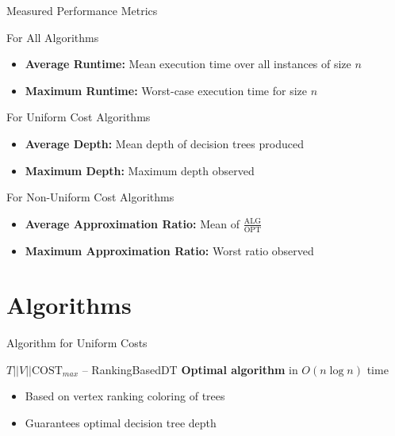 \documentclass[aspectratio=169]{beamer}
\newcommand{\OPT}{\text{OPT}}
\newcommand{\COST}{\text{COST}}
\begin{document}
\begin{frame}{Measured Performance Metrics}
\begin{block}{For All Algorithms}
\begin{itemize}
    \item \textbf{Average Runtime:} Mean execution time over all instances of size $n$
    \item \textbf{Maximum Runtime:} Worst-case execution time for size $n$
\end{itemize}
\end{block}

\pause

\begin{block}{For Uniform Cost Algorithms}
\begin{itemize}
    \item \textbf{Average Depth:} Mean depth of decision trees produced
    \item \textbf{Maximum Depth:} Maximum depth observed
\end{itemize}
\end{block}

\pause

\begin{block}{For Non-Uniform Cost Algorithms}
\begin{itemize}
    \item \textbf{Average Approximation Ratio:} Mean of $\frac{\text{ALG}}{\OPT}$
    \item \textbf{Maximum Approximation Ratio:} Worst ratio observed
\end{itemize}
\end{block}
\end{frame}

\section{Algorithms}

\begin{frame}{Algorithm for Uniform Costs}
\begin{block}{$T||V||\COST_{max}$ -- RankingBasedDT}
\textbf{Optimal algorithm} in $O(n \log n)$ time
\begin{itemize}
    \item Based on vertex ranking coloring of trees
    \item Guarantees optimal decision tree depth
\end{itemize}
\end{block}
\end{frame}
\end{document}
